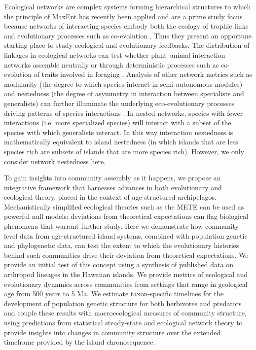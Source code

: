Ecological networks are complex systems forming hierarchical
structures to which the principle of MaxEnt has recently been applied
\citep{williams2010, harte2011} and are a prime study focus because
networks of interacting species embody both the ecology of trophic
links and evolutionary processes such as co-evolution
\citep{bascompte2007, donatti2011, nuismer2013, thompson2013}. Thus
they present an opportune starting place to study ecological and
evolutionary feedbacks. The distribution of linkages in ecological
networks can test whether plant–animal interaction networks assemble
neutrally or through deterministic processes such as co-evolution of
traits involved in foraging \citep{vazquez2005}. Analysis of other
network metrics such as modularity (the degree to which species
interact in semi-autonomous modules) and nestedness (the degree of
asymmetry in interaction between specialists and generalists) can
further illuminate the underlying eco-evolutionary processes driving
patterns of species interactions \citep{bascompte2007, donatti2011,
nuismer2013}. In nested networks, species with fewer interactions
(i.e. more specialized species) will interact with a subset of the
species with which generalists interact. In this way interaction
nestedness is mathematically equivalent to island nestedness (in which
islands that are less species rich are subsets of islands that are
more species rich). However, we only consider network nestedness here.

To gain insights into community assembly as it happens, we propose an
integrative framework that harnesses advances in both evolutionary and
ecological theory, placed in the context of age-structured
archipelagos. Mechanistically simplified ecological theories such as
the METE \citep{harte2011} can be used as powerful null models;
deviations from theoretical expectations can flag biological phenomena
that warrant further study. Here we demonstrate how community-level
data from age-structured island systems, combined with population
genetic and phylogenetic data, can test the extent to which the
evolutionary histories behind such communities drive their deviation
from theoretical expectations. We provide an initial test of this
concept using a synthesis of published data on arthropod lineages in
the Hawaiian islands. We provide metrics of ecological and
evolutionary dynamics across communities from settings that range in
geological age from 500 years to 5 Ma. We estimate taxon-specific
timelines for the development of population genetic structure for both
herbivores and predators and couple these results with macroecological
measures of community structure, using predictions from statistical
steady-state and ecological network theory to provide insights into
changes in community structure over the extended timeframe provided by
the island chronosequence.


